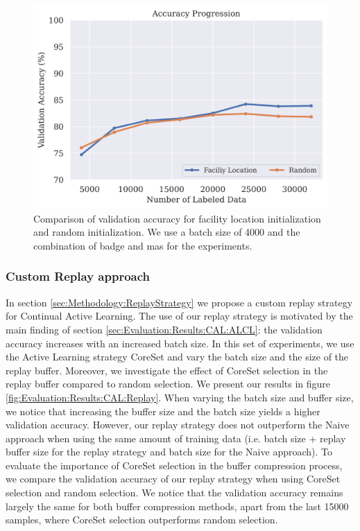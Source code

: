 \begin{figure}[h]
    \centering
    \includegraphics[width=\linewidth]{images/results_CAL/Facility_location_init.png}
    \caption[Initialization using Facility Location]{Comparison of validation accuracy for facility location initialization and random initialization. We use a batch size of 4000 and the combination of \gls{badge} and \gls{mas} for the experiments.}
    \label{fig:Evaluation:Results:CAL:FLinit}
\end{figure}


\subsubsection{Custom Replay approach}
\label{sec:Evaluation:Results:CAL:Replay}
In section \ref{sec:Methodology:ReplayStrategy} we propose a custom replay strategy for Continual Active Learning. The use of our replay strategy is motivated by the main finding of section \ref{sec:Evaluation:Results:CAL:ALCL}: the validation accuracy increases with an
increased batch size. In this set of experiments, we use the Active Learning strategy CoreSet and vary the batch size and the size of the replay buffer. Moreover, we investigate the effect of CoreSet selection in the replay buffer compared to random selection. We present our
results in figure \ref{fig:Evaluation:Results:CAL:Replay}. When varying the batch size and buffer size, we notice that increasing the buffer size and the batch size yields a higher validation accuracy. However, our replay strategy does not outperform the Naive approach when using
the same amount of training data (i.e. batch size + replay buffer size for the replay strategy and batch size for the Naive approach). To evaluate the importance of CoreSet selection in the buffer compression process, we compare the validation accuracy of our replay strategy
when using CoreSet selection and random selection. We notice that the validation accuracy remains largely the same for both buffer compression methods, apart from the last 15000 samples, where CoreSet selection outperforms random selection. \par

